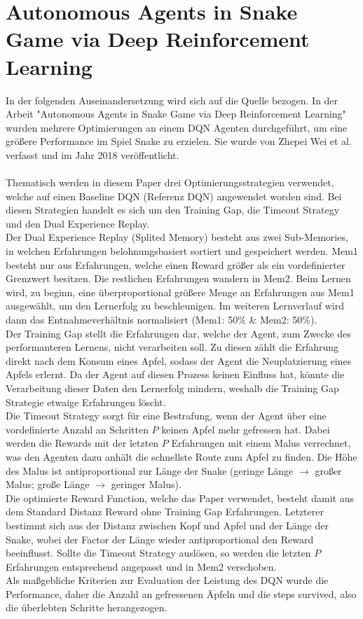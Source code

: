 \section{Autonomous Agents in Snake Game via Deep Reinforcement Learning} \label{sec:Paper_1}
In der folgenden Auseinandersetzung wird sich auf die Quelle \cite{Autonomous_Agents_in_Snake_Game_via_DRL} bezogen.
In der Arbeit "Autonomous Agents in Snake Game via Deep Reinforcement Learning" wurden mehrere Optimierungen an einem DQN Agenten durchgeführt, um eine größere Performance im Spiel Snake zu erzielen. Sie wurde von Zhepei Wei et al. verfasst und im Jahr 2018 veröffentlicht.\\
\\Thematisch werden in diesem Paper drei Optimierungsstrategien verwendet, welche auf einen Baseline DQN (Referenz DQN) angewendet worden sind. Bei diesen Strategien handelt es sich um den Training Gap, die Timeout Strategy und den Dual Experience Replay.\\
Der Dual Experience Replay (Splited Memory) besteht aus zwei Sub-Memories, in welchen Erfahrungen belohnungsbasiert sortiert und gespeichert werden. Mem1 besteht nur aus Erfahrungen, welche einen Reward größer als ein vordefinierter Grenzwert besitzen. Die restlichen Erfahrungen wandern in Mem2. Beim Lernen wird, zu beginn, eine überproportional größere Menge an Erfahrungen aus Mem1 ausgewählt, um den Lernerfolg zu beschleunigen. Im weiteren Lernverlauf wird dann das Entnahmeverhältnis normalisiert (Mem1: 50\% \& Mem2: 50\%).\\
Der Training Gap stellt die Erfahrungen dar, welche der Agent, zum Zwecke des performanteren Lernens, nicht verarbeiten soll. Zu diesen zählt die Erfahrung direkt nach dem Konsum eines Apfel, sodass der Agent die Neuplatzierung eines Apfels erlernt. Da der Agent auf diesen Prozess keinen Einfluss hat, könnte die Verarbeitung dieser Daten den Lernerfolg mindern, weshalb die Training Gap Strategie etwaige Erfahrungen löscht.\\
Die Timeout Strategy sorgt für eine Bestrafung, wenn der Agent über eine vordefinierte Anzahl an Schritten $P$ keinen Apfel mehr gefressen hat. Dabei werden die Rewards mit der letzten $P$ Erfahrungen mit einem Malus verrechnet, was den Agenten dazu anhält die schnellste Route zum Apfel zu finden. Die Höhe des Malus ist antiproportional zur Länge der Snake (geringe Länge $\rightarrow$ großer Malus; große Länge $\rightarrow$ geringer Malus).\\
Die optimierte Reward Function, welche das Paper verwendet, besteht damit aus dem Standard Distanz Reward ohne Training Gap Erfahrungen. Letzterer bestimmt sich aus der Distanz zwischen Kopf und Apfel und der Länge der Snake, wobei der Factor der Länge wieder antiproportional den Reward beeinflusst. Sollte die Timeout Strategy auslösen, so werden die letzten $P$ Erfahrungen entsprechend angepasst und in Mem2 verschoben.\\
Als maßgebliche Kriterien zur Evaluation der Leistung des DQN wurde die Performance, daher die Anzahl an gefressenen Äpfeln und die steps survived, also die überlebten Schritte herangezogen.

